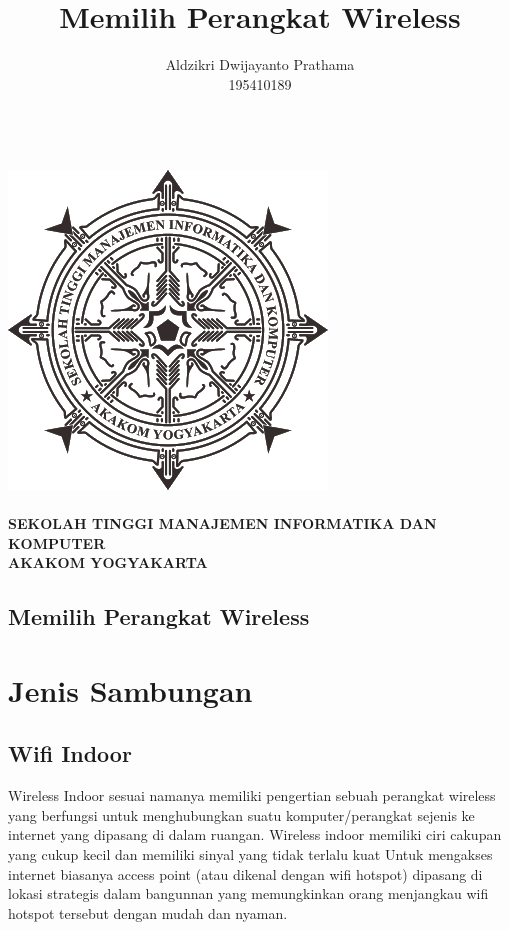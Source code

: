 \documentclass[a4paper,12pt]{article}
\begin{document}
\title{Memilih Perangkat Wireless}
\author{Aldzikri Dwijayanto Prathama
	\\195410189}
\makeatletter
\begin{titlepage}
	\begin{center}
		{\huge \bfseries \@title }\\[14ex]
		\includegraphics[scale=.8]{logo}\\[4ex]
		{\large \@author}\\[20ex]
		{\large \bfseries {SEKOLAH TINGGI MANAJEMEN INFORMATIKA DAN KOMPUTER \\
				AKAKOM YOGYAKARTA}}
	\end{center}


\end{titlepage}
\makeatother
\newpage

\begin{center}
\section*{Memilih Perangkat Wireless}
\end{center}
\section{Jenis Sambungan}
\subsection{Wifi Indoor}
Wireless Indoor sesuai namanya memiliki pengertian sebuah perangkat wireless yang berfungsi untuk menghubungkan suatu
komputer/perangkat sejenis ke internet yang dipasang di dalam ruangan. Wireless indoor memiliki ciri cakupan yang cukup kecil
dan memiliki sinyal yang tidak terlalu kuat Untuk mengakses internet biasanya access point (atau dikenal dengan wifi
hotspot) dipasang di lokasi strategis dalam bangunnan yang memungkinkan orang menjangkau wifi hotspot tersebut dengan
mudah dan nyaman.
\end{document}
